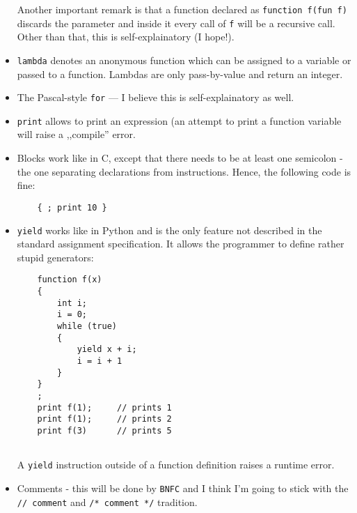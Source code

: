 \documentclass[11pt]{article}
\begin{document}
\begin{itemize}
	Another important remark is that a function declared as \texttt{function f(fun f)} discards the parameter and inside it every call of \texttt{f} will be a recursive call. Other than that, this is self-explainatory (I hope!).
	\item \texttt{lambda} denotes an anonymous function which can be assigned to a variable or passed to a function. Lambdas are only pass-by-value and return an integer.
	\item The Pascal-style \texttt{for} --- I believe this is self-explainatory as well.
	\item \texttt{print} allows to print an expression (an attempt to print a function variable will raise a ,,compile'' error.
	\item Blocks work like in C, except that there needs to be at least one semicolon - the one separating declarations from instructions. Hence, the following code is fine:
	\begin{lstlisting}
	{ ; print 10 }
	\end{lstlisting}
	\item \texttt{yield} works like in Python and is the only feature not described in the standard assignment specification. It allows the programmer to define rather stupid generators:
	\begin{lstlisting}
	function f(x)
	{
		int i;
		i = 0;
		while (true)
		{
			yield x + i;
			i = i + 1
		}
	}
	;
	print f(1);		// prints 1
	print f(1);		// prints 2
	print f(3)		// prints 5
		
	\end{lstlisting}
	A \texttt{yield} instruction outside of a function definition raises a runtime error.
	\item Comments - this will be done by \texttt{BNFC} and I think I'm going to stick with the \texttt{// comment} and \texttt{/* comment */} tradition.
\end{itemize}
\end{document}
